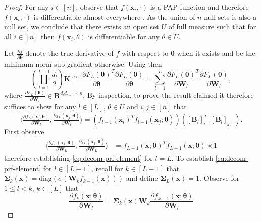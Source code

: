\documentclass{article}
\theoremstyle{definition}
\def\vtheta{{\bm{\theta}}}
\def\vx{{\bm{x}}}
\def\mB{{\bm{B}}}
\def\mK{{\bm{K}}}
\def\mR{{\bm{R}}}
\def\mW{{\bm{W}}}
\def\mSigma{{\bm{\Sigma}}}
\begin{document}
\lemmaNTKdecomp*
\begin{proof}
   
  
For any $i \in [n]$, observe that $f(\vx_i, \cdot)$ is a PAP function \cite[Definition 5]{10.5555/3495724.3496288} and therefore $f(\vx_i, \cdot)$ is differentiable almost everywhere \cite[Proposition 4]{10.5555/3495724.3496288}. As the union of $n$ null sets is also a null set, we conclude that there exists an open set $U$ of full measure such that for all $i \in [n]$ then $f(\vx_i, \theta)$ is differentiable for any $\theta \in U$. 

Let $\tfrac{\partial f}{ \partial \vtheta}$ denote the true derivative of $f$ with respect to $\vtheta$ when it exists and be the minimum norm sub-gradient otherwise. Using \cite[Corollary 13]{10.5555/3495724.3496288} then
 \[
    \left( \prod_{l = 1}^{L - 1} \frac{d_l}{2}\right)\mK \stackrel{a.e.}{=} \frac{\partial F_L(\vtheta)}{\partial \vtheta }^T  \frac{\partial F_L(\vtheta)}{\partial \vtheta } = \sum_{l = 1}^{L} \frac{\partial F_L(\vtheta)}{\partial \mW_l }^T  \frac{\partial F_L(\vtheta)}{\partial \mW_l },
    \]
    where $\tfrac{\partial F_L(\vtheta)}{\partial \mW_l} \in \mR^{d_ld_{l-1} \times n}$. By inspection, to prove the result claimed it therefore suffices to show for any $l \in  [L]$, $\theta \in U$ and $i,j \in [n]$ that
    \begin{equation}\label{eq:decom-prf-element}
       \langle  \tfrac{\partial f_L(\vx_i; \vtheta)}{\partial \mW_{l} }, \tfrac{\partial f_L(\vx_j; \vtheta)}{\partial \mW_{l} } \rangle   = \left( f_{l-1}(\vx_i)^T f_{l-1}(\vx_j; \vtheta) \right) \left( [\mB_{l}]_{i,:}^T [\mB_{l}]_{j,:} \right).
    \end{equation}
    First observe
    \begin{align*}
        \langle  \tfrac{\partial f_L(\vx_i; \vtheta)}{\partial \mW_L }, \tfrac{\partial f_L(\vx_j; \vtheta)}{\partial \mW_L } \rangle &= f_{L-1}(\vx; \vtheta)^Tf_{L-1}(\vx; \vtheta) \times 1
    \end{align*}
    therefore establishing \eqref{eq:decom-prf-element} for $l = L$. To establish \eqref{eq:decom-prf-element} for $l \in [L-1]$, recall for $k \in [L-1]$ that $\mSigma_k(\vx) = \text{diag}\left( \dot{\sigma}(\mW_k f_{k-1}(\vx))\right)$ and define $\mSigma_L(\vx) = 1$. Observe for $1 \leq l < k$, $k \in [L]$ that
    \begin{equation} \label{eq:decomp-prf-1}
    \frac{\partial f_{k}(\vx; \vtheta)}{ \partial \mW_l } = \mSigma_k(\vx) \mW_k  \frac{\partial f_{k-1}(\vx;\vtheta) }{\partial \mW_{l}}

\end{equation}
\end{proof}
\end{document}
